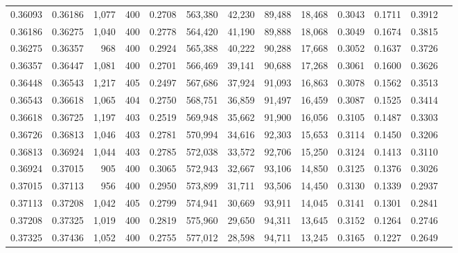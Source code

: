 \begin{tabular}{rrrrrrrrrrrrr}
0.36093 & 0.36186 &  1,077 & 400 &                                     0.2708 & 563,380 &  42,230 &  89,488 &  18,468 & 0.3043 & 0.1711 & 0.3912 \\
0.36186 & 0.36275 &  1,040 & 400 &                                     0.2778 & 564,420 &  41,190 &  89,888 &  18,068 & 0.3049 & 0.1674 & 0.3815 \\
0.36275 & 0.36357 &    968 & 400 &                                     0.2924 & 565,388 &  40,222 &  90,288 &  17,668 & 0.3052 & 0.1637 & 0.3726 \\
0.36357 & 0.36447 &  1,081 & 400 &                                     0.2701 & 566,469 &  39,141 &  90,688 &  17,268 & 0.3061 & 0.1600 & 0.3626 \\
0.36448 & 0.36543 &  1,217 & 405 &                                     0.2497 & 567,686 &  37,924 &  91,093 &  16,863 & 0.3078 & 0.1562 & 0.3513 \\
0.36543 & 0.36618 &  1,065 & 404 &                                     0.2750 & 568,751 &  36,859 &  91,497 &  16,459 & 0.3087 & 0.1525 & 0.3414 \\
0.36618 & 0.36725 &  1,197 & 403 &                                     0.2519 & 569,948 &  35,662 &  91,900 &  16,056 & 0.3105 & 0.1487 & 0.3303 \\
0.36726 & 0.36813 &  1,046 & 403 &                                     0.2781 & 570,994 &  34,616 &  92,303 &  15,653 & 0.3114 & 0.1450 & 0.3206 \\
0.36813 & 0.36924 &  1,044 & 403 &                                     0.2785 & 572,038 &  33,572 &  92,706 &  15,250 & 0.3124 & 0.1413 & 0.3110 \\
0.36924 & 0.37015 &    905 & 400 &                                     0.3065 & 572,943 &  32,667 &  93,106 &  14,850 & 0.3125 & 0.1376 & 0.3026 \\
0.37015 & 0.37113 &    956 & 400 &                                     0.2950 & 573,899 &  31,711 &  93,506 &  14,450 & 0.3130 & 0.1339 & 0.2937 \\
0.37113 & 0.37208 &  1,042 & 405 &                                     0.2799 & 574,941 &  30,669 &  93,911 &  14,045 & 0.3141 & 0.1301 & 0.2841 \\
0.37208 & 0.37325 &  1,019 & 400 &                                     0.2819 & 575,960 &  29,650 &  94,311 &  13,645 & 0.3152 & 0.1264 & 0.2746 \\
0.37325 & 0.37436 &  1,052 & 400 &                                     0.2755 & 577,012 &  28,598 &  94,711 &  13,245 & 0.3165 & 0.1227 & 0.2649 \\

\end{tabular}
